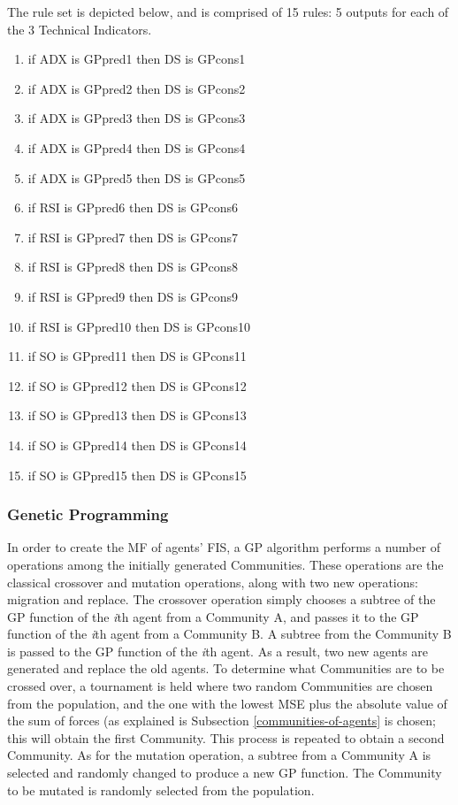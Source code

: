 \documentclass[12pt,journal,draftcls,onecolumn]{IEEEtran}
\begin{document}
The rule set is depicted below, and is comprised of 15 rules: 5 outputs for each of the 3 Technical Indicators.

\begin{enumerate}
\item if ADX is GPpred1 then DS is GPcons1
\item if ADX is GPpred2 then DS is GPcons2
\item if ADX is GPpred3 then DS is GPcons3
\item if ADX is GPpred4 then DS is GPcons4
\item if ADX is GPpred5 then DS is GPcons5

\item if RSI is GPpred6 then DS is GPcons6
\item if RSI is GPpred7 then DS is GPcons7
\item if RSI is GPpred8 then DS is GPcons8
\item if RSI is GPpred9 then DS is GPcons9
\item if RSI is GPpred10 then DS is GPcons10

\item if SO is GPpred11 then DS is GPcons11
\item if SO is GPpred12 then DS is GPcons12
\item if SO is GPpred13 then DS is GPcons13
\item if SO is GPpred14 then DS is GPcons14
\item if SO is GPpred15 then DS is GPcons15
\end{enumerate}

\subsubsection{Genetic Programming}

In order to create the MF of agents' FIS, a GP algorithm performs a number of operations among the initially generated Communities. These operations are the classical crossover and mutation operations, along with two new operations: migration and replace. The crossover operation simply chooses a subtree of the GP function of the \textit{i}th agent from a Community A, and passes it to the GP function of the \textit{i}th agent from a Community B. A subtree from the Community B is passed to the GP function of the \textit{i}th agent. As a result, two new agents are generated and replace the old agents. To determine what Communities are to be crossed over, a tournament is held where two random Communities are chosen from the population, and the one with the lowest MSE plus the absolute value of the sum of forces (as explained is Subsection \ref{communities-of-agents} is chosen; this will obtain the first Community. This process is repeated to obtain a second Community. As for the mutation operation, a subtree from a Community A is selected and randomly changed to produce a new GP function. The Community to be mutated is randomly selected from the population.
\end{document}
